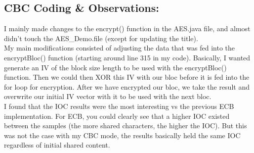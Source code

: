 \documentclass[10pt]{article}
\begin{document}
\begin{enumerate}
	\subsection{CBC Coding \& Observations: }
	\noindent I mainly made changes to the encrypt() function in the AES.java file, and almost didn't touch the AES\_Demo.file (except for updating the title). \\
	My main modifications consisted of adjusting the data that was fed into the encryptBloc() function (starting around line 315 in my code). Basically, I wanted generate an IV of the block size length to be used with the encryptBloc() function. Then we could then XOR this IV with our bloc before it is fed into the for loop for encryption. After we have encrypted our bloc, we take the result and overwrite our initial IV vector with it to be used with the next bloc.\\
	\newline
	\noindent I found that the IOC results were the most interesting vs the previous ECB implementation. For ECB, you could clearly see that a higher IOC existed between the samples (the more shared characters, the higher the IOC). But this was not the case with my CBC mode, the results basically held the same IOC regardless of initial shared content.

\end{enumerate}
\vspace{0.2in}
\end{document}
